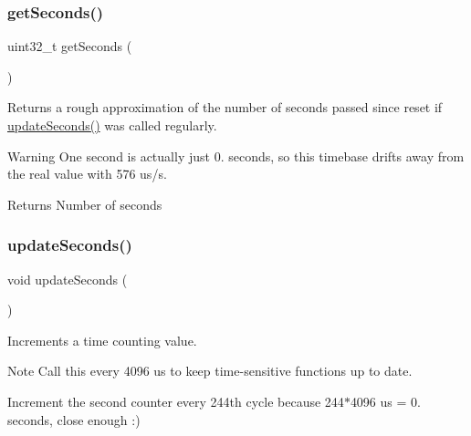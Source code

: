 \subsubsection{\texorpdfstring{getSeconds()}{getSeconds()}}
{\footnotesize\ttfamily uint32\+\_\+t get\+Seconds (\begin{DoxyParamCaption}{ }\end{DoxyParamCaption})}



Returns a rough approximation of the number of seconds passed since reset if \mbox{\hyperlink{group__stack_gabeccd7481529472ac536f41b0d2be690}{update\+Seconds()}} was called regularly. 

\begin{DoxyWarning}{Warning}
One second is actually just 0. seconds, so this timebase drifts away from the real value with 576 us/s. 
\end{DoxyWarning}
\begin{DoxyReturn}{Returns}
Number of seconds 
\end{DoxyReturn}
\mbox{\label{group__stack_gabeccd7481529472ac536f41b0d2be690}} 
\subsubsection{\texorpdfstring{updateSeconds()}{updateSeconds()}}
{\footnotesize\ttfamily void update\+Seconds (\begin{DoxyParamCaption}{ }\end{DoxyParamCaption})}



Increments a time counting value. 

\begin{DoxyNote}{Note}
Call this every 4096 us to keep time-\/sensitive functions up to date. 
\end{DoxyNote}
Increment the second counter every 244th cycle because 244$\ast$4096 us = 0. seconds, close enough \+:)